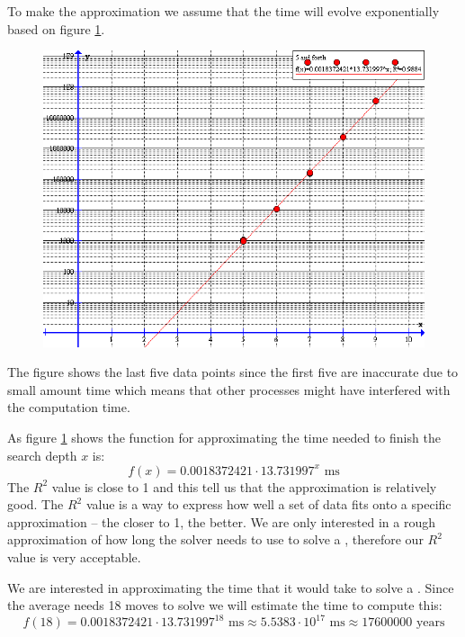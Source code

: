 To make the approximation we assume that the time will evolve exponentially based on figure \ref{fig:timeFunction}.

\begin{figure}[htb]
	\centering
		\includegraphics[scale=0.5]{input/pics/timeFunction}
	\caption{}
	\label{fig:timeFunction}
\end{figure}

The figure shows the last five data points since the first five are inaccurate due to small amount time which means that other processes might have interfered with the computation time.

As figure \ref{fig:timeFunction} shows the function for approximating the time needed to finish the search depth $x$ is:
\[
f(x)=0.0018372421 \cdot 13.731997^{x} \text{ ms}
\]
The $R^2$ value is close to 1 and this tell us that the approximation is relatively good. The $R^2$ value is a way to express how well a set of data fits onto a specific approximation -- the closer to 1, the better. We are only interested in a rough approximation of how long the solver needs to use to solve a \rubik{}, therefore our $R^2$ value is very acceptable.

We are interested in approximating the time that it would take to solve a \rubik{}. Since the average \rubik{} needs 18 moves to solve \cite{kociemba09} we will estimate the time to compute this:
\[
f(18) = 0.0018372421 \cdot 13.731997^{18} \text{ ms} \approx 5.5383 \cdot 10^{17} \text{ ms} \approx 17600000 \text{ years}
\]

